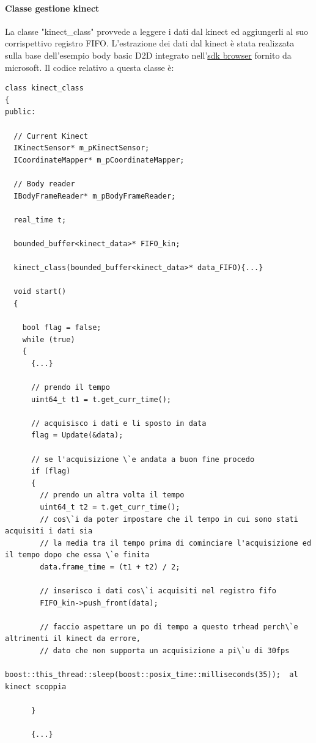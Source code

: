 \documentclass[10pt,a4paper]{article}
\begin{document}
\paragraph{Classe gestione kinect}
La classe "kinect\_class" provvede a leggere i dati dal kinect ed aggiungerli al suo corrispettivo registro FIFO. L'estrazione dei dati dal kinect \`e stata realizzata sulla base dell'esempio body basic D2D integrato nell'\href{https://www.microsoft.com/en-us/download/details.aspx?id=44561}{sdk browser} fornito da microsoft. Il codice relativo a questa classe \`e:
\begin{lstlisting}[style=mycpp, caption=librerie usate, captionpos=b]
class kinect_class
{
public:

  // Current Kinect
  IKinectSensor* m_pKinectSensor;
  ICoordinateMapper* m_pCoordinateMapper;

  // Body reader
  IBodyFrameReader* m_pBodyFrameReader;

  real_time t;

  bounded_buffer<kinect_data>* FIFO_kin;

  kinect_class(bounded_buffer<kinect_data>* data_FIFO){...}

  void start()
  {
    
    bool flag = false;
    while (true)
    {
      {...}
      
      // prendo il tempo
      uint64_t t1 = t.get_curr_time();  
      
      // acquisisco i dati e li sposto in data
      flag = Update(&data);

      // se l'acquisizione \`e andata a buon fine procedo
      if (flag)
      {
        // prendo un altra volta il tempo
        uint64_t t2 = t.get_curr_time();
        // cos\`i da poter impostare che il tempo in cui sono stati acquisiti i dati sia 
        // la media tra il tempo prima di cominciare l'acquisizione ed il tempo dopo che essa \`e finita
        data.frame_time = (t1 + t2) / 2;

        // inserisco i dati cos\`i acquisiti nel registro fifo
        FIFO_kin->push_front(data);
        
        // faccio aspettare un po di tempo a questo trhead perch\`e altrimenti il kinect da errore, 
        // dato che non supporta un acquisizione a pi\`u di 30fps
        boost::this_thread::sleep(boost::posix_time::milliseconds(35));  al kinect scoppia

      }

      {...}


\end{lstlisting}
\end{document}
